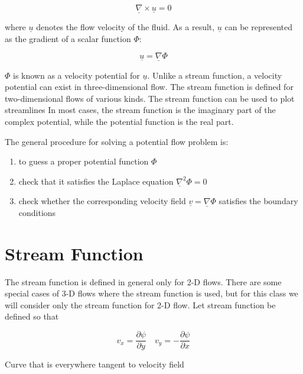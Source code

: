 \begin{equation*}
  \underline{\nabla}\times\underline{u}=0
\end{equation*}

where $\underline{u}$ denotes the flow velocity of the fluid.
As a result, $\underline{u}$ can be represented as the gradient of a scalar function $\Phi$:

\begin{equation*}
  \underline{u}=\underline{\nabla}\Phi
\end{equation*}

$\Phi$ is known as a velocity potential for $\underline{u}$.
Unlike a stream function, a velocity potential can exist in three-dimensional flow.
The stream function is defined for two-dimensional flows of various kinds.
The stream function can be used to plot streamlines
In most cases, the stream function is the imaginary part of the complex potential, while the potential function is the real part.

The general procedure for solving a potential flow problem is:

\begin{enumerate}
  \item{to guess a proper potential function $\Phi$}
  \item{check that it satisfies the Laplace equation $\underline{\nabla}^{2}\Phi=0$}
  \item{check whether the corresponding velocity field $\underline{v}=\underline{\nabla}\Phi$ satisfies the boundary conditions}
\end{enumerate}

\section{Stream Function}

The stream function is defined in general only for 2-D flows.
There are some special cases of 3-D flows where the stream function is used, but for this class we will consider only the stream function for 2-D flow.
Let stream function be defined so that

\begin{equation*}
  v_{x}=\frac{\partial\psi}{\partial{}y}
  \quad
  v_{y}=-\frac{\partial\psi}{\partial{}x}
\end{equation*}

\begin{defn-dan}[Streamline]
  Curve that is everywhere tangent to velocity field
\end{defn-dan}

